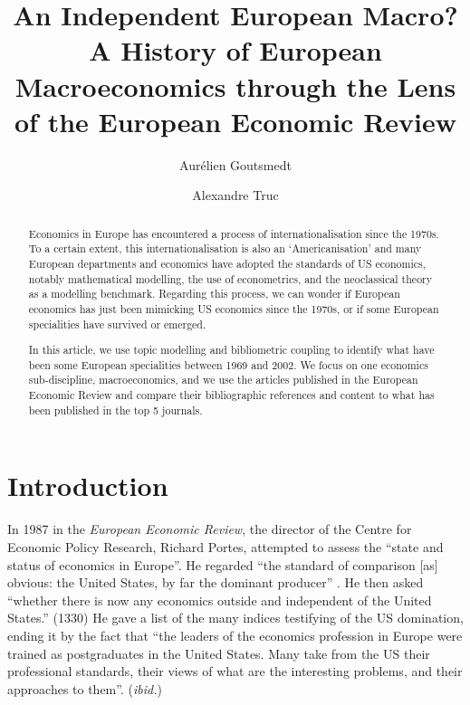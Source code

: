 \documentclass[]{elsarticle} %
\begin{document}
\begin{frontmatter}

  \title{An Independent European Macro? A History of European
Macroeconomics through the Lens of the European Economic Review}
    \author[1]{Aurélien Goutsmedt%
  }
  
    \author[2]{Alexandre Truc}
  
  
  \begin{abstract}
  Economics in Europe has encountered a process of internationalisation
  since the 1970s. To a certain extent, this internationalisation is
  also an `Americanisation' and many European departments and economics
  have adopted the standards of US economics, notably mathematical
  modelling, the use of econometrics, and the neoclassical theory as a
  modelling benchmark. Regarding this process, we can wonder if European
  economics has just been mimicking US economics since the 1970s, or if
  some European specialities have survived or emerged.

  In this article, we use topic modelling and bibliometric coupling to
  identify what have been some European specialities between 1969 and
  2002. We focus on one economics sub-discipline, macroeconomics, and we
  use the articles published in the European Economic Review and compare
  their bibliographic references and content to what has been published
  in the top 5 journals.
  \end{abstract}
  
 \end{frontmatter}

\hypertarget{introduction}{%
\section{Introduction}\label{introduction}}

In 1987 in the \emph{European Economic Review}, the director of the
Centre for Economic Policy Research, Richard Portes, attempted to assess
the ``state and status of economics in Europe''. He regarded ``the
standard of comparison {[}as{]} obvious: the United States, by far the
dominant producer'' \citep[1329]{portes1987}. He then asked ``whether
there is now any economics outside and independent of the United
States.'' (1330) He gave a list of the many indices testifying of the US
domination, ending it by the fact that ``the leaders of the economics
profession in Europe were trained as postgraduates in the United States.
Many take from the US their professional standards, their views of what
are the interesting problems, and their approaches to them''.
(\emph{ibid.})
\end{document}
